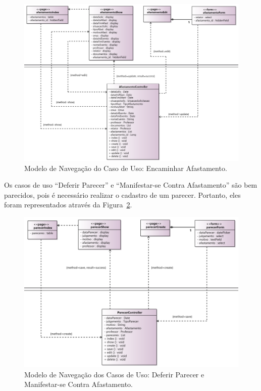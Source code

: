 \begin{figure}[!h]
	\centering
	\includegraphics[width=1\textwidth]{figuras/fig-projeto-encaminharAfastamento.png}
	\caption{Modelo de Navegação do Caso de Uso: Encaminhar Afastamento.}
	\label{fig-projeto-encaminharAfastamento}
\end{figure}

Os casos de uso ``Deferir Parecer'' e ``Manifestar-se Contra Afastamento'' são bem parecidos, pois é necessário realizar o cadastro de um parecer. Portanto, eles foram representados através da Figura~\ref{fig-projeto-defParecer_manifContra}. 

\begin{figure}[!h]
	\centering
	\includegraphics[width=1\textwidth]{figuras/fig-projeto-defParecer_manifContra.png}
	\caption{Modelo de Navegação dos Casos de Uso: Deferir Parecer e Manifestar-se Contra Afastamento.}
	\label{fig-projeto-defParecer_manifContra}
\end{figure}


